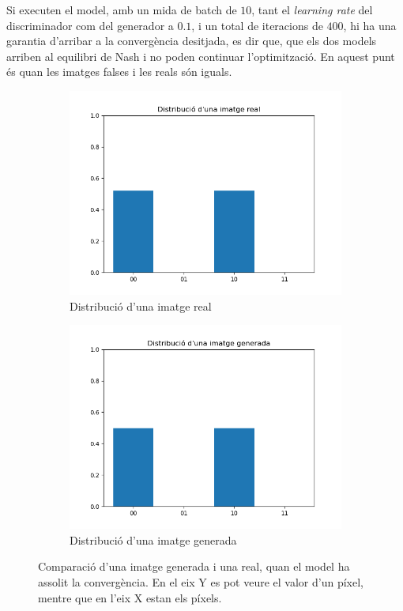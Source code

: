 Si executen el model, amb un mida de batch de $10$, tant el \textit{learning rate} del discriminador com del generador a $0.1$, i un total de iteracions de $400$, hi ha una garantia d'arribar a la convergència desitjada, es dir que, que els dos models arriben al equilibri de Nash i no poden continuar l'optimització. En aquest punt és quan les imatges falses i les reals són iguals.

\begin{figure}
	\label{fig:comp_imatge}
	\begin{subfigure}{0.51\textwidth}
		\includegraphics[width=\linewidth]{figures/model/real_distribution.png}
		\caption{Distribució d'una imatge real} \label{fig:1a}
	\end{subfigure}%
	\hspace*{\fill}   %
	\begin{subfigure}{0.51\textwidth}
		\includegraphics[width=\linewidth]{figures/model/fake_distribution.png}
		\caption{Distribució d'una imatge generada} \label{fig:1b}
	\end{subfigure}%
	\hspace*{\fill}
	\caption{Comparació d'una imatge generada i una real, quan el model ha assolit la convergència. En el eix Y es pot veure el valor d'un píxel, mentre que en l'eix X estan els píxels. }   %
\end{figure}
